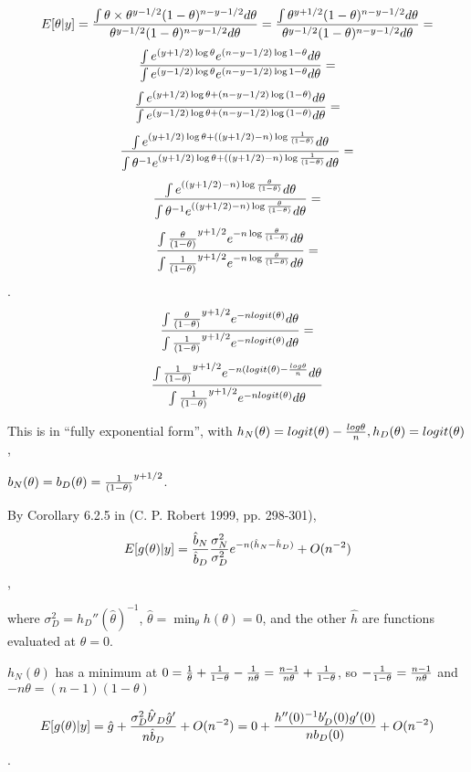 \documentclass{article}
\begin{document}
\[E[\theta \vert y] = {\int \theta \times \theta^{y - 1/2}(1 - \theta)^{n - y - 1/2} d\theta \over
 \theta^{y - 1/2}(1 - \theta)^{n - y - 1/2}d\theta} = 
{\int \theta^{y + 1/2}(1 - \theta)^{n - y - 1/2} d\theta \over
 \theta^{y - 1/2}(1 - \theta)^{n - y - 1/2}d\theta} = \]
\[{\int e^{(y + 1/2)\log \theta}e^{(n - y - 1/2)\log{1 - \theta}} d\theta \over
 \int e^{(y - 1/2)\log \theta}e^{(n - y - 1/2)\log{1 - \theta}} d\theta} = \]
\[{\int e^{(y + 1/2)\log \theta + (n - y - 1/2)\log{(1 - \theta)}} d\theta \over
 \int e^{(y - 1/2)\log \theta + (n - y - 1/2)\log{(1 - \theta)}} d\theta} = \]
\[{\int e^{(y + 1/2)\log \theta + ((y + 1/2) - n)\log{1 \over (1 - \theta)}} d\theta \over
 \int \theta^{-1} e^{(y + 1/2)\log \theta + ((y + 1/2) - n)\log{1 \over (1 - \theta)}} d\theta} = \]
\[{\int e^{((y + 1/2) - n)\log{\theta \over (1 - \theta)}} d\theta \over
 \int \theta^{-1} e^{((y + 1/2) - n)\log{\theta \over (1 - \theta)}} d\theta} = \]
 \[{\int {\theta \over (1 - \theta)}^{y + 1/2} e^{-n\log{\theta \over (1 - \theta)}} d\theta \over
 \int {1 \over (1 - \theta)}^{y + 1/2} e^{-n\log{\theta \over (1 - \theta)}} d\theta } = \].
 \[{\int {\theta \over (1 - \theta)}^{y + 1/2} e^{-n logit(\theta)} d\theta \over
 \int {1 \over (1 - \theta)}^{y + 1/2} e^{-n logit(\theta)} d\theta } = \] 
  \[{\int {1 \over (1 - \theta)}^{y + 1/2} e^{-n (logit(\theta) - {log \theta \over n}} d\theta \over
 \int {1 \over (1 - \theta)}^{y + 1/2} e^{-n logit(\theta)} d\theta }\] 

 This is in ``fully exponential form'', with \(h_N(\theta)  = logit(\theta) - {log \theta \over n}, h_D(\theta) = logit(\theta)\),
 
 \(b_N(\theta) =  b_D(\theta) =  {1 \over (1 - \theta)}^{y + 1/2}\).
 
 By Corollary 6.2.5 in (C. P. Robert 1999, pp. 298-301), 
 \[E[g(\theta) \vert y] ={\hat{b}_N \over \hat{b}_D}{\sigma^2_N \over \sigma^2_D}e^{-n(\hat{h}_N - \hat{h}_D)} +  O(n^{-2})\],
 
 where \(\sigma_D^2 = h_D''(\hat{\theta})^{-1}\), \(\hat{\theta} = \min_{\theta}h(\theta) = 0\),
 and the other \(\hat{h}\) are functions evaluated at \(\hat{\theta} = 0\).
 
 \(h_N(\theta)\) has a minimum at 
 \(0 = {1\over \theta} + {1 \over 1 - \theta} - {1\over n\theta} = {n-1 \over n\theta} + {1 \over 1 - \theta}\), so
\(-{1 \over 1 - \theta} = {n-1 \over n\theta}\) and \(-n\theta = (n-1)(1 - \theta)\)
 
 
 \[E[g(\theta) \vert y] = \hat{g} + 
 {\sigma_D^2\hat{b'}_D \hat{g}' \over n \hat{b}_D}+ O(n^{-2}) = 
 0 + {h''(0)^{-1}b'_D(0) g'(0) \over n b_D(0)} + O(n^{-2})\].
 
\end{document}
